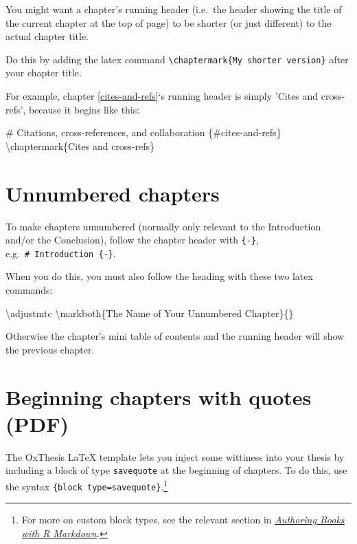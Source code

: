 \documentclass[a4paper, twoside]{templates/ociamthesis}
\newenvironment{Shaded}{\begin{snugshade}}{\end{snugshade}}
\newcommand{\FunctionTok}[1]{\textcolor[rgb]{0.00,0.00,0.00}{#1}}
\newcommand{\NormalTok}[1]{#1}
\renewenvironment{Shaded}
{
  \vspace{10pt}%
  \begin{snugshade}%
}{%
  \end{snugshade}%
  \vspace{8pt}%
}
\begin{document}
You might want a chapter's running header (i.e.~the header showing the title of the current chapter at the top of page) to be shorter (or just different) to the actual chapter title.

Do this by adding the latex command \texttt{\textbackslash{}chaptermark\{My\ shorter\ version\}} after your chapter title.

For example, chapter \ref{cites-and-refs}`s running header is simply 'Cites and cross-refs', because it begins like this:

\begin{Shaded}
\begin{Highlighting}[]
\FunctionTok{\# Citations, cross{-}references, and collaboration \{\#cites{-}and{-}refs\} }
\NormalTok{\textbackslash{}chaptermark\{Cites and cross{-}refs\}}
\end{Highlighting}
\end{Shaded}

\hypertarget{unnumbered-chapters}{%
\section{Unnumbered chapters}\label{unnumbered-chapters}}

To make chapters unnumbered (normally only relevant to the Introduction and/or the Conclusion), follow the chapter header with \texttt{\{-\}}, e.g.~\texttt{\#\ Introduction\ \{-\}}.

When you do this, you must also follow the heading with these two latex commands:

\begin{Shaded}
\begin{Highlighting}[]
\FunctionTok{\textbackslash{}adjustmtc}
\FunctionTok{\textbackslash{}markboth}\NormalTok{\{The Name of Your Unnumbered Chapter\}\{\}}
\end{Highlighting}
\end{Shaded}

Otherwise the chapter's mini table of contents and the running header will show the previous chapter.

\hypertarget{beginning-chapters-with-quotes-pdf}{%
\section{Beginning chapters with quotes (PDF)}\label{beginning-chapters-with-quotes-pdf}}

The OxThesis LaTeX template lets you inject some wittiness into your thesis by including a block of type \texttt{savequote} at the beginning of chapters.
To do this, use the syntax \texttt{\textasciigrave{}\textasciigrave{}\textasciigrave{}\{block\ type=\textquotesingle{}savequote\textquotesingle{}\}}.\footnote{For more on custom block types, see the relevant section in \href{https://bookdown.org/yihui/bookdown/custom-blocks.html}{\emph{Authoring Books with R Markdown}}.}
\end{document}
